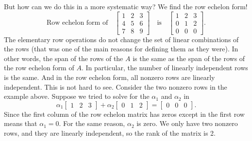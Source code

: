 But how can we do this in a more systematic way?  We find the row echelon
form!
\begin{equation*}
\text{Row echelon form of}
\quad
\begin{bmatrix}
1 & 2 & 3 \\
4 & 5 & 6  \\
7 & 8 & 9
\end{bmatrix}
\quad
\text{is}
\quad
\begin{bmatrix}
1 & 2 & 3 \\
0 & 1 & 2  \\
0 & 0 & 0
\end{bmatrix} .
\end{equation*}
The elementary row operations do not change the set of linear combinations of
the rows (that was one of the main reasons for defining them as they were).
In other words, the span of the rows of the $A$ is the same
as the span of the rows of the row echelon form of $A$.
In particular, the number of linearly independent rows is the same.
And in the row echelon form, all nonzero rows are linearly independent.
This is not hard to see.
Consider the two nonzero rows in the example above.
Suppose we 
tried to solve for the $\alpha_1$ and $\alpha_2$
in
\begin{equation*}
\alpha_1
\begin{bmatrix}
1 & 2 & 3
\end{bmatrix} 
+
\alpha_2
\begin{bmatrix}
0 & 1 & 2 
\end{bmatrix} =
\begin{bmatrix}
0 & 0 & 0
\end{bmatrix} .
\end{equation*}
Since the first column
of the row echelon matrix has zeros except in the first row means that
$\alpha_1 = 0$.  For the same reason, $\alpha_2$ is zero.
We only have two nonzero rows,
and they are linearly independent, so the rank of the matrix is 2.

